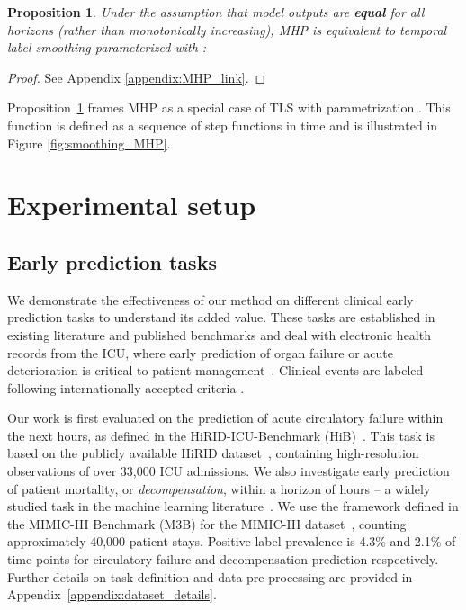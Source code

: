 \documentclass[nohyperref]{article}
\newtheorem{theorem}{Proposition}
\begin{document}
\begin{theorem}
\label{prop:MHP}
Under the assumption that model outputs are \textbf{equal} for all horizons  (rather than monotonically increasing), MHP is equivalent to temporal label smoothing parameterized with :
\end{theorem}
\begin{comment}\begin{figure}
    \centering
    \texttt{[image: figures/step\_smoothing\_time.pdf]}
    \caption{\textbf{Label smoothing strength over time}, with staircase parametrization and .}
    \label{fig:smoothing_MHP}
\end{figure}
\end{comment}
\begin{proof} See Appendix \ref{appendix:MHP_link}.\end{proof}

Proposition~\ref{prop:MHP} frames MHP as a special case of TLS with parametrization . This function is defined as a sequence of step functions in time and is illustrated in Figure \ref{fig:smoothing_MHP}. 


\section{Experimental setup}\label{sec:exp_setup}
\subsection{Early prediction tasks} \label{sec:tasks}

We demonstrate the effectiveness of our method on different clinical early prediction tasks to understand its added value. These tasks are established in existing literature and published benchmarks and deal with electronic health records from the ICU, where early prediction of organ failure or acute deterioration is critical to patient management~\citep{sutton2020}. Clinical events are labeled following internationally accepted criteria \citep{harutyunyan2019multitask, yeche2021}. 

Our work is first evaluated on the prediction of acute circulatory failure within the next  hours, as defined in the HiRID-ICU-Benchmark (HiB)~\citep{yeche2021}. This task is based on the publicly available HiRID dataset~\citep{hyland2020}, containing high-resolution observations of over 33,000 ICU admissions. We also investigate early prediction of patient mortality, or \textit{decompensation}, within a horizon of  hours -- a widely studied task in the machine learning literature~\citep{bellamy2020evaluating}. We use the framework defined in the MIMIC-III Benchmark (M3B) \citep{harutyunyan2019multitask} for the MIMIC-III dataset~\citep{johnson2016}, counting approximately 40,000 patient stays. Positive label prevalence is 4.3\% and 2.1\% of time points for circulatory failure and decompensation prediction respectively. Further details on task definition and data pre-processing are provided in Appendix~\ref{appendix:dataset_details}.
\end{document}
